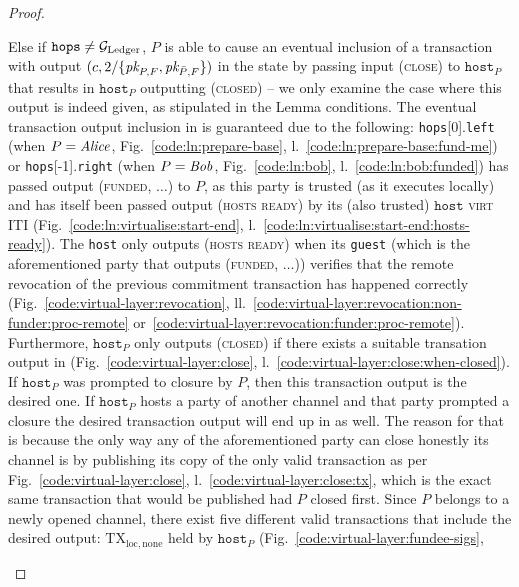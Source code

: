 \begin{proof}
\begin{itemize}
    Else if $\texttt{hops} \neq \mathcal{G}_{\mathrm{Ledger}}$, $P$ is able to cause an eventual
    inclusion of a transaction with output $(c, 2/\{\textit{pk}_{P, F}, \textit{pk}_{\bar{P} ,
    F}\})$ in the \ledger state by passing input (\textsc{close}) to
    $\texttt{host}_P$ that results in $\texttt{host}_P$ outputting
    (\textsc{closed}) -- we only examine the case where this output is indeed
    given, as stipulated in the Lemma conditions.  The eventual transaction
    output inclusion in \ledger is guaranteed due to the following:
    \texttt{hops}[0].\texttt{left} (when $P = \mathit{Alice}$,
    Fig.~\ref{code:ln:prepare-base}, l.~\ref{code:ln:prepare-base:fund-me}) or
    \texttt{hops}[-1].\texttt{right} (when $P = \mathit{Bob}$, Fig.~\ref{code:ln:bob},
    l.~\ref{code:ln:bob:funded}) has passed output (\textsc{funded}, $\dots$) to
    $P$, as this party is trusted (as it executes locally) and has itself been
    passed output (\textsc{hosts ready}) by its (also trusted) $\texttt{host}$
    \textsc{virt} ITI (Fig.~\ref{code:ln:virtualise:start-end},
    l.~\ref{code:ln:virtualise:start-end:hosts-ready}). The \texttt{host} only
    outputs (\textsc{hosts ready}) when its \texttt{guest} (which is the
    aforementioned party that outputs (\textsc{funded}, $\dots$)) verifies that
    the remote revocation of the previous commitment transaction has happened
    correctly (Fig.~\ref{code:virtual-layer:revocation},
    ll.~\ref{code:virtual-layer:revocation:non-funder:proc-remote}
    or~\ref{code:virtual-layer:revocation:funder:proc-remote}). Furthermore,
    $\texttt{host}_P$ only outputs (\textsc{closed}) if there exists a suitable
    transation output in \ledger (Fig.~\ref{code:virtual-layer:close},
    l.~\ref{code:virtual-layer:close:when-closed}). If $\texttt{host}_P$ was
    prompted to closure by $P$, then this transaction output is the desired one.
    If $\texttt{host}_P$ hosts a party of another channel and that party
    prompted a closure the desired transaction output will end up in \ledger as
    well. The reason for that is because the only way any of the aforementioned
    party can close honestly its channel is by publishing its copy of the only
    valid transaction as per Fig.~\ref{code:virtual-layer:close},
    l.~\ref{code:virtual-layer:close:tx}, which is the exact same transaction
    that would be published had $P$ closed first. Since $P$ belongs to a newly
    opened channel, there exist five different valid transactions that include
    the desired output: $\mathrm{TX}_{\mathrm{loc}, \mathrm{none}}$ held by
    $\texttt{host}_P$ (Fig.~\ref{code:virtual-layer:fundee-sigs},

\end{itemize}
\end{proof}
